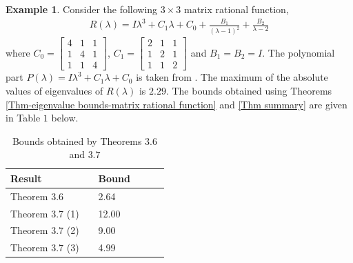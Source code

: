 \documentclass[12pt, reqno]{amsart}
\theoremstyle{definition}
\newtheorem{example}[theorem]{Example}
\theoremstyle{remark}
\numberwithin{equation}{section}
\begin{document}
\begin{example}\label{example-4.1}
Consider the following $3 \times 3$ matrix rational function, 
\begin{align*}
R(\lambda) = I \lambda^3+C_1 \lambda +C_0 +\displaystyle 
\frac{B_1}{(\lambda-1)^2} + \frac{B_2}{\lambda-2} 
\end{align*}
where $C_0 =\begin{bmatrix}
4 & 1 & 1 \\
1 & 4 & 1 \\
1 & 1 & 4
\end{bmatrix}$, $C_1 =\begin{bmatrix}
2 & 1 & 1 \\
1 & 2 & 1 \\
1 & 1 & 2
\end{bmatrix}$ and $B_1 = B_2 = I$. The polynomial part $P(\lambda)= 
I \lambda^3+C_1 \lambda +C_0$ is taken from \cite{Bani-Fuad-Rawan}. 
The maximum of the absolute values of eigenvalues of $R(\lambda)$ is $2.29$. 
The bounds obtained using Theorems \ref{Thm-eigenvalue bounds-matrix rational function} 
and \ref{Thm summary} are given in Table $1$ below.

\begin{table}[h!]
\centering
\begin{tabular}{l l l l l l}
\hline
Result & \hspace{5cm} & Bound \\ [0.5ex] 
\hline

Theorem 3.6 & \hspace{5cm} & 2.64\\
Theorem 3.7 (1) & \hspace{5cm} & 12.00\\
Theorem 3.7 (2) & \hspace{5cm} & 9.00\\
Theorem 3.7 (3) & \hspace{5cm} & 4.99\\[1ex] 
\hline 
\end{tabular}
\vspace{0.2cm}
\caption{Bounds obtained by Theorems $3.6$ and $3.7$}
\label{table:2}
\end{table} 
\end{example}
\end{document}
